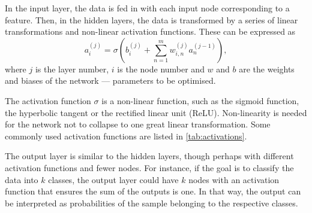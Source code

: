 In the input layer, the data is fed in with each input node corresponding to a feature.
Then, in the hidden layers, the data is transformed by a series of linear transformations and non-linear activation functions.
These can be expressed as
\begin{equation}
    \label{eq:nn}
    a_i^{(j)} = \sigma\left( b^{(j)}_i + \sum_{n=1}^m w^{(j)}_{i,n} a^{(j-1)}_n\right),
\end{equation}
where $j$ is the layer number, $i$ is the node number and $w$ and $b$ are the weights and biases of the network — parameters to be optimised.

The activation function $\sigma$ is a non-linear function, such as the sigmoid function, the hyperbolic tangent or the rectified linear unit (ReLU).
Non-linearity is needed for the network not to collapse to one great linear transformation.
Some commonly used activation functions are listed in \cref{tab:activations}.

The output layer is similar to the hidden layers, though perhaps with different activation functions and fewer nodes.
For instance, if the goal is to classify the data into $k$ classes, the output layer could have $k$ nodes with an activation function that ensures the sum of the outputs is one.
In that way, the output can be interpreted as probabilities of the sample belonging to the respective classes.

